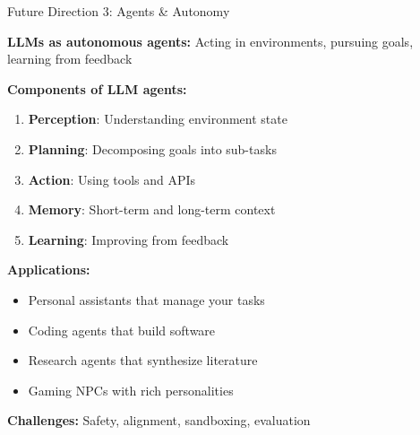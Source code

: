 \documentclass[aspectratio=169]{beamer}
\begin{document}
\begin{frame}[shrink=10]{Future Direction 3: Agents \& Autonomy 🤖}
\begin{futurebox}
\textbf{LLMs as autonomous agents:} Acting in environments, pursuing goals, learning from feedback
\end{futurebox}

\textbf{Components of LLM agents:}
\begin{enumerate}\setlength{\itemsep}{0pt}
    \item \textbf{Perception}: Understanding environment state
    \item \textbf{Planning}: Decomposing goals into sub-tasks
    \item \textbf{Action}: Using tools and APIs
    \item \textbf{Memory}: Short-term and long-term context
    \item \textbf{Learning}: Improving from feedback
\end{enumerate}

\vspace{0.5em}

\textbf{Applications:}
\begin{itemize}\setlength{\itemsep}{0pt}
    \item Personal assistants that manage your tasks
    \item Coding agents that build software
    \item Research agents that synthesize literature
    \item Gaming NPCs with rich personalities
\end{itemize}

\vspace{0.5em}

\textbf{Challenges:} Safety, alignment, sandboxing, evaluation
\end{frame}
\end{document}
